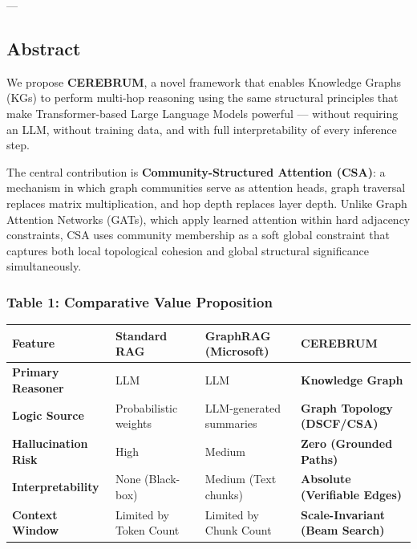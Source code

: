 \documentclass[10pt,journal,compsoc]{IEEEtran}
\begin{document}
---

\subsection{Abstract}

We propose \textbf{CEREBRUM}, a novel framework that enables Knowledge Graphs (KGs)
to perform multi-hop reasoning using the same structural principles that make
Transformer-based Large Language Models powerful — without requiring an LLM,
without training data, and with full inter\-pretability of every inference step.

The central contr\-ibution is \textbf{Community-Structured Attention (CSA)}: a
mechanism in which graph communities serve as attention heads, graph traversal
replaces matrix multi\-plication, and hop depth replaces layer depth. Unlike
Graph Attention Networks (GATs), which apply learned attention within hard
adjacency constraints, CSA uses community membership as a soft global
constraint that captures both local topological cohesion and global structural
signi\-ficance simul\-taneously.

\subsubsection{Table 1: Comparative Value Proposition}

\begin{center}
{\footnotesize
\begin{tabularx}{\columnwidth}{|>{\raggedright\arraybackslash}X|>{\raggedright\arraybackslash}X|>{\raggedright\arraybackslash}X|>{\raggedright\arraybackslash}X|}
\hline
Feature & Standard RAG & GraphRAG (Microsoft) & CEREBRUM \\ \hline
\textbf{Primary Reasoner} & LLM & LLM & \textbf{Knowledge Graph} \\ \hline
\textbf{Logic Source} & Probab\-ilistic weights & LLM-generated summaries & \textbf{Graph Topology (DSCF/CSA)} \\ \hline
\textbf{Halluc\-ination Risk} & High & Medium & \textbf{Zero (Grounded Paths)} \\ \hline
\textbf{Interp\-retability} & None (Black-box) & Medium (Text chunks) & \textbf{Absolute (Verifiable Edges)} \\ \hline
\textbf{Context Window} & Limited by Token Count & Limited by Chunk Count & \textbf{Scale-Invariant (Beam Search)} \\ \hline
\end{tabularx}
}
\end{center}
\end{document}
